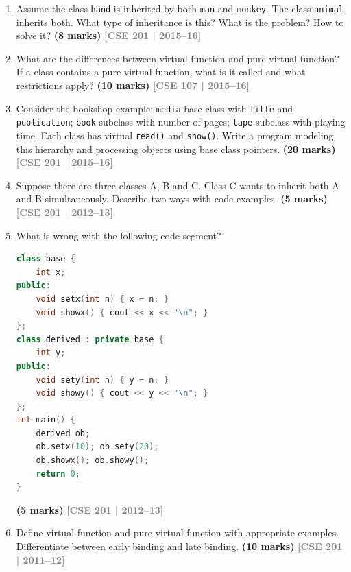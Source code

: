 \documentclass[12pt,a3paper]{article}
\newcommand{\yr}[1]{\hfill\textcolor{gray}{\small\textbf{[#1]}}}
\newcommand{\mk}[1]{\textcolor{orange!70!black}{\small\textbf{(#1 marks)}}}
\begin{document}
\begin{enumerate}
\item Assume the class \texttt{hand} is inherited by both \texttt{man} and \texttt{monkey}. The class \texttt{animal} inherits both. What type of inheritance is this? What is the problem? How to solve it? \mk{8}
\yr{CSE 201 | 2015--16}



\item What are the differences between virtual function and pure virtual function? If a class contains a pure virtual function, what is it called and what restrictions apply? \mk{10}
\yr{CSE 107 | 2015--16}





\item Consider the bookshop example: \texttt{media} base class with \texttt{title} and \texttt{publication}; \texttt{book} subclass with number of pages; \texttt{tape} subclass with playing time. Each class has virtual \texttt{read()} and \texttt{show()}. Write a program modeling this hierarchy and processing objects using base class pointers. \mk{20}
\yr{CSE 201 | 2015--16}




\item Suppose there are three classes A, B and C. Class C wants to inherit both A and B simultaneously. Describe two ways with code examples. \mk{5}
\yr{CSE 201 | 2012--13}




\item What is wrong with the following code segment?
\begin{lstlisting}[language=C++]
class base {
    int x;
public:
    void setx(int n) { x = n; }
    void showx() { cout << x << "\n"; }
};
class derived : private base {
    int y;
public:
    void sety(int n) { y = n; }
    void showy() { cout << y << "\n"; }
};
int main() {
    derived ob;
    ob.setx(10); ob.sety(20);
    ob.showx(); ob.showy();
    return 0;
}
\end{lstlisting}
\mk{5}
\yr{CSE 201 | 2012--13}




\item Define virtual function and pure virtual function with appropriate examples. Differentiate between early binding and late binding. \mk{10}
\yr{CSE 201 | 2011--12}


\end{enumerate}
\end{document}
